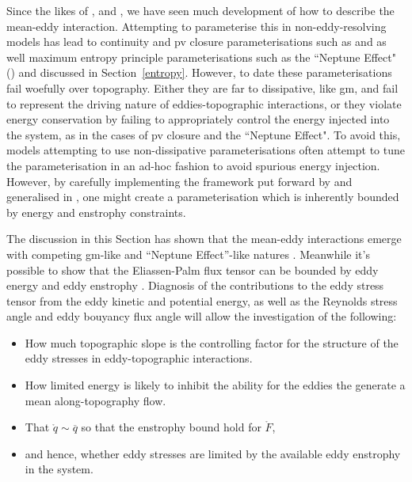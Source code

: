 \documentclass[12pt,a4paper]{report}
\newcommand*\thkmean[1]{\overline{#1}}
\newcommand*\spec[1]{\mathring{#1}}
\begin{document}
Since the likes of \cite{young1982shear}, \cite{holloway1987systematic} and
\cite{gent1990}, we have seen much development of how to describe the mean-eddy interaction.
Attempting to parameterise this in non-eddy-resolving models has lead to 
continuity and \gls{pv} closure parameterisations such as \cite{gent1990}
and \cite{greatbatch1998exploring} as well maximum entropy principle parameterisations 
such as the ``Neptune Effect" (\cite{holloway1992representing}) and \cite{polyakov2001eddy} discussed in Section~\ref{entropy}.
However, to date these parameterisations fail woefully over topography. Either
they are far to dissipative, like \gls{gm}, and fail to represent the driving nature
of eddies-topographic interactions, or they violate energy conservation
by failing to appropriately control the energy injected into the system, as in the cases
of \gls{pv} closure and the ``Neptune Effect". To avoid this, models attempting to
use non-dissipative parameterisations often attempt to tune the parameterisation in
an ad-hoc fashion to avoid spurious energy injection. However, by carefully implementing
the framework put forward by \cite{marshall2012framework} and generalised in
\cite{maddison2013eliassen}, one might create a parameterisation which is
inherently bounded by energy and enstrophy constraints.

The discussion in this Section has shown that the mean-eddy interactions 
emerge with competing \gls{gm}-like and ``Neptune Effect''-like natures
\cite{adcock2000interactions}. Meanwhile  it's possible to show that
the Eliassen-Palm flux tensor can be bounded by eddy energy and eddy enstrophy
\cite{marshall2012framework}.
Diagnosis of the contributions to the eddy stress tensor from
the eddy kinetic and potential energy, as well as the Reynolds stress angle and eddy bouyancy flux angle will allow the investigation of the following:
\begin{itemize} 
		\item How much topographic slope is the controlling factor for the structure of the eddy stresses in eddy-topographic interactions.
		\item How limited energy is likely to inhibit the ability for the eddies the
			generate a mean along-topography flow.
	    \item That $\spec{q} \sim \thkmean{q}$ so that the enstrophy bound hold for $\spec{F}$,
		\item and hence, whether eddy stresses are limited by the available eddy enstrophy in the system.
\end{itemize} 
 
\end{document}
